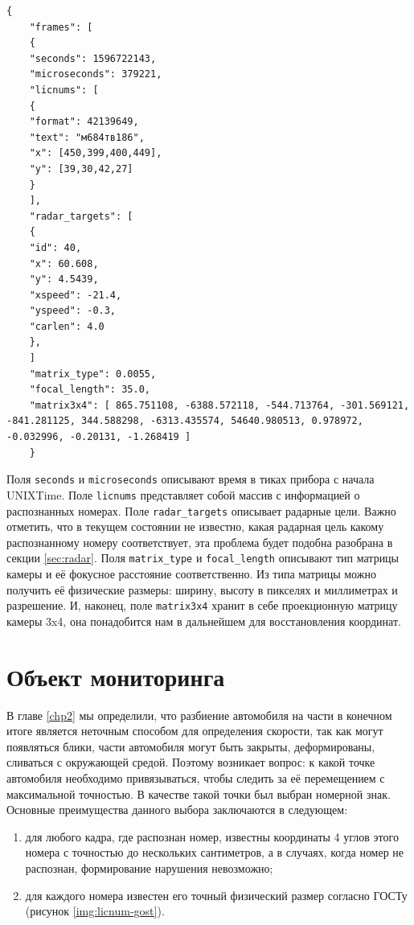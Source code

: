 \documentclass[specification,annotation,times]{itmo-student-thesis}
\begin{document}
	\begin{lstlisting}[float=!h,caption={Пример JSON-файла.},label={lst:json}]
	{
	"frames": [
	{
	"seconds": 1596722143,
	"microseconds": 379221,
	"licnums": [
	{
	"format": 42139649,
	"text": "м684тв186",
	"x": [450,399,400,449],
	"y": [39,30,42,27]
	}
	],
	"radar_targets": [
	{
	"id": 40,
	"x": 60.608,
	"y": 4.5439,
	"xspeed": -21.4,
	"yspeed": -0.3,
	"carlen": 4.0
	},
	]
	"matrix_type": 0.0055,
	"focal_length": 35.0,
	"matrix3x4": [ 865.751108, -6388.572118, -544.713764, -301.569121, -841.281125,	344.588298, -6313.435574, 54640.980513,	0.978972, -0.032996, -0.20131, -1.268419 ]
	}
	\end{lstlisting}
	
	Поля \texttt{seconds} и \texttt{microseconds} описывают время в тиках прибора с начала UNIXTime. Поле \texttt{licnums} представляет собой массив с информацией о распознанных номерах. Поле \texttt{radar\_targets} описывает радарные цели. Важно отметить, что в текущем состоянии не известно, какая радарная цель какому распознанному номеру соответствует, эта проблема будет подобна разобрана в секции \ref{sec:radar}. Поля \texttt{matrix\_type} и \texttt{focal\_length} описывают тип матрицы камеры и её фокусное расстояние соответственно. Из типа матрицы можно получить её физические размеры: ширину, высоту в пикселях и миллиметрах и разрешение. И, наконец, поле \texttt{matrix3x4} хранит в себе проекционную матрицу камеры 3x4, она понадобится нам в дальнейшем для восстановления координат.
	
	\section{Объект мониторинга} \label{sec:monitor}
	В главе \ref{chp2} мы определили, что разбиение автомобиля на части в конечном итоге является неточным способом для определения скорости, так как могут появляться блики, части автомобиля могут быть закрыты, деформированы, сливаться с окружающей средой. Поэтому возникает вопрос: к какой точке автомобиля необходимо привязываться, чтобы следить за её перемещением с максимальной точностью. В качестве такой точки был выбран номерной знак. Основные преимущества данного выбора заключаются в следующем:
	
	\begin{enumerate}
		\item для любого кадра, где распознан номер, известны координаты 4 углов этого номера с точностью до нескольких сантиметров, а в случаях, когда номер не распознан, формирование нарушения невозможно;
		\item для каждого номера известен его точный физический размер согласно ГОСТу (рисунок \ref{img:licnum-gost}).
	\end{enumerate}
	
\end{document}
